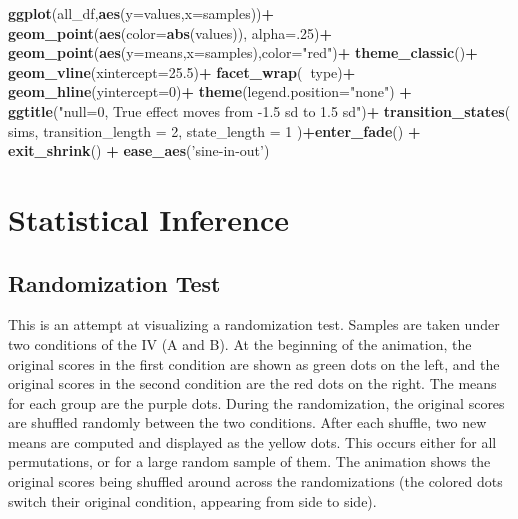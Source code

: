 \documentclass[]{book}
\newenvironment{Shaded}{\begin{snugshade}}{\end{snugshade}}
\newcommand{\DataTypeTok}[1]{\textcolor[rgb]{0.13,0.29,0.53}{#1}}
\newcommand{\DecValTok}[1]{\textcolor[rgb]{0.00,0.00,0.81}{#1}}
\newcommand{\FloatTok}[1]{\textcolor[rgb]{0.00,0.00,0.81}{#1}}
\newcommand{\KeywordTok}[1]{\textcolor[rgb]{0.13,0.29,0.53}{\textbf{#1}}}
\newcommand{\NormalTok}[1]{#1}
\newcommand{\OperatorTok}[1]{\textcolor[rgb]{0.81,0.36,0.00}{\textbf{#1}}}
\newcommand{\StringTok}[1]{\textcolor[rgb]{0.31,0.60,0.02}{#1}}
\begin{document}
\begin{Shaded}
\begin{Highlighting}[]
\KeywordTok{ggplot}\NormalTok{(all_df,}\KeywordTok{aes}\NormalTok{(}\DataTypeTok{y=}\NormalTok{values,}\DataTypeTok{x=}\NormalTok{samples))}\OperatorTok{+}
\StringTok{  }\KeywordTok{geom_point}\NormalTok{(}\KeywordTok{aes}\NormalTok{(}\DataTypeTok{color=}\KeywordTok{abs}\NormalTok{(values)), }\DataTypeTok{alpha=}\NormalTok{.}\DecValTok{25}\NormalTok{)}\OperatorTok{+}
\StringTok{  }\KeywordTok{geom_point}\NormalTok{(}\KeywordTok{aes}\NormalTok{(}\DataTypeTok{y=}\NormalTok{means,}\DataTypeTok{x=}\NormalTok{samples),}\DataTypeTok{color=}\StringTok{"red"}\NormalTok{)}\OperatorTok{+}
\StringTok{  }\KeywordTok{theme_classic}\NormalTok{()}\OperatorTok{+}
\StringTok{  }\KeywordTok{geom_vline}\NormalTok{(}\DataTypeTok{xintercept=}\FloatTok{25.5}\NormalTok{)}\OperatorTok{+}
\StringTok{  }\KeywordTok{facet_wrap}\NormalTok{(}\OperatorTok{~}\NormalTok{type)}\OperatorTok{+}
\StringTok{  }\KeywordTok{geom_hline}\NormalTok{(}\DataTypeTok{yintercept=}\DecValTok{0}\NormalTok{)}\OperatorTok{+}
\StringTok{  }\KeywordTok{theme}\NormalTok{(}\DataTypeTok{legend.position=}\StringTok{"none"}\NormalTok{) }\OperatorTok{+}
\StringTok{  }\KeywordTok{ggtitle}\NormalTok{(}\StringTok{"null=0, True effect moves from -1.5 sd to 1.5 sd"}\NormalTok{)}\OperatorTok{+}
\StringTok{  }\KeywordTok{transition_states}\NormalTok{(}
\NormalTok{    sims,}
    \DataTypeTok{transition_length =} \DecValTok{2}\NormalTok{,}
    \DataTypeTok{state_length =} \DecValTok{1}
\NormalTok{  )}\OperatorTok{+}\KeywordTok{enter_fade}\NormalTok{() }\OperatorTok{+}\StringTok{ }
\StringTok{  }\KeywordTok{exit_shrink}\NormalTok{() }\OperatorTok{+}
\StringTok{  }\KeywordTok{ease_aes}\NormalTok{(}\StringTok{'sine-in-out'}\NormalTok{)}
\end{Highlighting}
\end{Shaded}

\hypertarget{statistical-inference}{%
\section{Statistical Inference}\label{statistical-inference}}

\hypertarget{randomization-test}{%
\subsection{Randomization Test}\label{randomization-test}}

This is an attempt at visualizing a randomization test. Samples are taken under two conditions of the IV (A and B). At the beginning of the animation, the original scores in the first condition are shown as green dots on the left, and the original scores in the second condition are the red dots on the right. The means for each group are the purple dots. During the randomization, the original scores are shuffled randomly between the two conditions. After each shuffle, two new means are computed and displayed as the yellow dots. This occurs either for all permutations, or for a large random sample of them. The animation shows the original scores being shuffled around across the randomizations (the colored dots switch their original condition, appearing from side to side).
\end{document}
